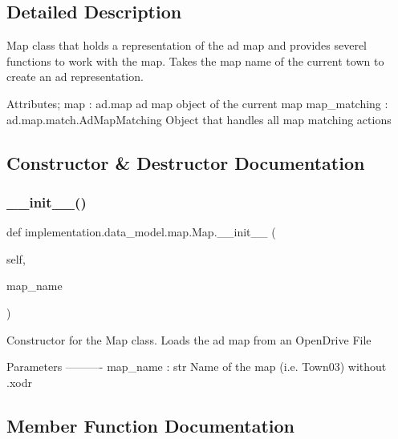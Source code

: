 \subsection{Detailed Description}
\begin{DoxyVerb}Map class that holds a representation of the ad map and provides severel functions to work with the map.
Takes the map name of the current town to create an ad representation.

Attributes;
map : ad.map
    ad map object of the current map
map_matching : ad.map.match.AdMapMatching
    Object that handles all map matching actions
\end{DoxyVerb}
 

\subsection{Constructor \& Destructor Documentation}
\mbox{\label{classimplementation_1_1data__model_1_1map_1_1_map_a4fc6942eed69c519ac3b34ff2ff0a92d}} 
\subsubsection{\texorpdfstring{\+\_\+\+\_\+init\+\_\+\+\_\+()}{\_\_init\_\_()}}
{\footnotesize\ttfamily def implementation.\+data\+\_\+model.\+map.\+Map.\+\_\+\+\_\+init\+\_\+\+\_\+ (\begin{DoxyParamCaption}\item[{}]{self,  }\item[{}]{map\+\_\+name }\end{DoxyParamCaption})}

\begin{DoxyVerb}Constructor for the Map class. Loads the ad map from an OpenDrive File

Parameters
----------
map_name : str
    Name of the map (i.e. Town03) without .xodr
\end{DoxyVerb}
 

\subsection{Member Function Documentation}
\mbox{\label{classimplementation_1_1data__model_1_1map_1_1_map_aa594532ade53c7e6ec730e657e383271}} 
